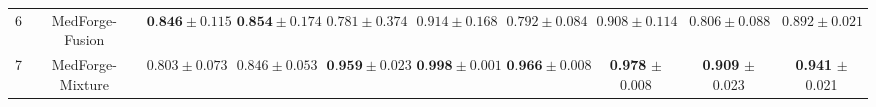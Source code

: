 \begin{table*}[ht]
{\begin{tabular}{c|c|cc|cc|cc|cc}
\hline
6 & MedForge-Fusion & \multicolumn{1}{c|}{$\textbf{0.846} \pm 0.115$} & {$\textbf{0.854} \pm 0.174$} & \multicolumn{1}{c|}{$0.781 \pm 0.374$} & {$0.914 \pm 0.168$} & \multicolumn{1}{c|}{$0.792 \pm 0.084$} & {$0.908 \pm 0.114$} & \multicolumn{1}{c|}{$0.806 \pm 0.088$} & {$0.892 \pm 0.021$} \\
7 & MedForge-Mixture & \multicolumn{1}{c|}{$0.803 \pm 0.073$} & {$0.846 \pm 0.053$} & \multicolumn{1}{c|}{$\textbf{0.959} \pm 0.023$} & {$\textbf{0.998} \pm 0.001$} & \multicolumn{1}{c|}{$\textbf{0.966} \pm 0.008$} & {\textbf{0.978} $\pm$ 0.008} & \multicolumn{1}{c|}{\textbf{0.909} $\pm$ 0.023} & {\textbf{0.941} $\pm$ 0.021} \\
\bottomrule
\end{tabular}
}
\end{table*}
